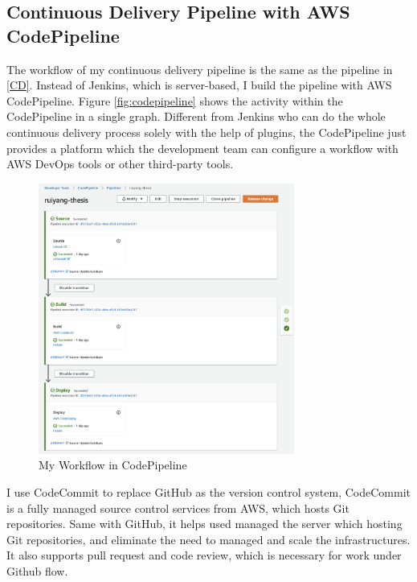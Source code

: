 \subsection{Continuous Delivery Pipeline with AWS CodePipeline}
The workflow of my continuous delivery pipeline is the same as the pipeline in \ref{CD}. Instead of Jenkins, which is server-based, I build the pipeline with AWS CodePipeline. Figure \ref{fig:codepipeline} shows the activity within the CodePipeline in a single graph. Different from Jenkins who can do the whole continuous delivery process solely with the help of plugins, the CodePipeline just provides a platform which the development team can configure a workflow with AWS DevOps tools or other third-party tools. 
\begin{figure}[h]
     \centering
     \includegraphics[width=0.75\textwidth]{pics/cp-interface.png}
     \caption{My Workflow in CodePipeline}
     \label{fig:cp-edit}
    \end{figure}
\par
I use CodeCommit to replace GitHub as the version control system, CodeCommit is a fully managed source control services \cite{AWSCodeC33:online} from AWS, which hosts Git repositories. Same with GitHub, it helps used managed the server which hosting Git repositories, and eliminate the need to managed and scale the infrastructures. It also supports pull request and code review, which is necessary for work under Github flow. 
